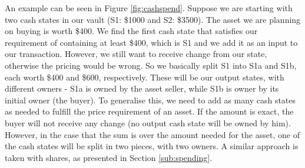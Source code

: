 \documentclass[12pt,twoside]{article}
\begin{document}
An example can be seen in Figure \ref{fig:cashspend}. Suppose we are starting with two cash states in our vault (S1: \$1000 and S2: \$3500). The asset we are planning on buying is worth \$400. We find the first cash state that satisfies our requirement of containing at least \$400, which is S1 and we add it as an input to our transaction. However, we still want to receive change from our state, otherwise the pricing would be wrong. So we basically split S1 into S1a and S1b, each worth \$400 and \$600, respectively. These will be our output states, with different owners - S1a is owned by the asset seller, while S1b is owner by its initial owner (the buyer). To generalise this, we need to add as many cash states as needed to fulfill the price requirement of an asset. If the amount is exact, the buyer will not receive any change (no output cash state will be owned by him). However, in the case that the sum is over the amount needed for the asset, one of the cash states will be split in two pieces, with two owners. A similar approach is taken with shares, as presented in Section \ref{sub:spending}.
\end{document}
